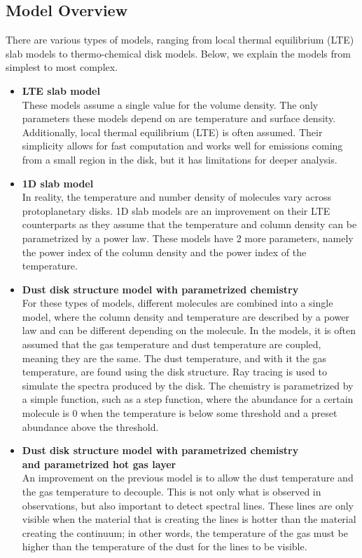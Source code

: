 \documentclass[oneside, single, authoryear, semicolon, 12pt]{lion-msc}
\newcommand{\4}{$_4$}
\newcommand{\3}{$_3$}
\newcommand{\2}{$_2$}
\begin{document}
\subsection{Model Overview}
There are various types of models, ranging from local thermal equilibrium (LTE) slab models to thermo-chemical disk models. Below, we explain the models from simplest to most complex.
\begin{itemize}
    \item \textbf{LTE slab model} \\
    These models assume a single value for the volume density. The only parameters these models depend on are temperature and surface density. Additionally, local thermal equilibrium (LTE) is often assumed. Their simplicity allows for fast computation and works well for emissions coming from a small region in the disk, but it has limitations for deeper analysis.

    \item \textbf{1D slab model} \\
    In reality, the temperature and number density of molecules vary across protoplanetary disks. 1D slab models are an improvement on their LTE counterparts as they assume that the temperature and column density can be parametrized by a power law. These models have 2 more parameters, namely the power index of the column density and the power index of the temperature.

    \item \textbf{Dust disk structure model with parametrized chemistry} \\
    For these types of models, different molecules are combined into a single model, where the column density and temperature are described by a power law and can be different depending on the molecule. In the models, it is often assumed that the gas temperature and dust temperature are coupled, meaning they are the same. The dust temperature, and with it the gas temperature, are found using the disk structure. Ray tracing is used to simulate the spectra produced by the disk. The chemistry is parametrized by a simple function, such as a step function, where the abundance for a certain molecule is 0 when the temperature is below some threshold and a preset abundance above the threshold.

    \item \textbf{Dust disk structure model with parametrized chemistry\\ and parametrized hot gas layer} \\
    An improvement on the previous model is to allow the dust temperature and the gas temperature to decouple. This is not only what is observed in observations, but also important to detect spectral lines. These lines are only visible when the material that is creating the lines is hotter than the material creating the continuum; in other words, the temperature of the gas must be higher than the temperature of the dust for the lines to be visible.


\end{itemize}
\end{document}
